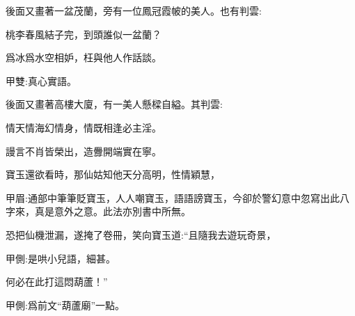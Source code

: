 \begin{parag}
    後面又畫著一盆茂蘭，旁有一位鳳冠霞帔的美人。也有判雲:
\end{parag}


\begin{poem}
    \begin{pl}桃李春風結子完，到頭誰似一盆蘭？\end{pl}

    \begin{pl}爲冰爲水空相妒，枉與他人作話談。\end{pl}
    \begin{note}甲雙:真心實語。\end{note}

\end{poem}


\begin{parag}
    後面又畫著高樓大廈，有一美人懸樑自縊。其判雲:
\end{parag}


\begin{poem}
    \begin{pl}情天情海幻情身，情既相逢必主淫。\end{pl}

    \begin{pl}謾言不肖皆榮出，造釁開端實在寧。\end{pl}
\end{poem}


\begin{parag}
    寶玉還欲看時，那仙姑知他天分高明，性情穎慧，\begin{note}甲眉:通部中筆筆貶寶玉，人人嘲寶玉，語語謗寶玉，今卻於警幻意中忽寫出此八字來，真是意外之意。此法亦別書中所無。\end{note}恐把仙機泄漏，遂掩了卷冊，笑向寶玉道:“且隨我去遊玩奇景，\begin{note}甲側:是哄小兒語，細甚。\end{note}何必在此打這悶葫蘆！”\begin{note}甲側:爲前文“葫蘆廟”一點。\end{note}
\end{parag}


